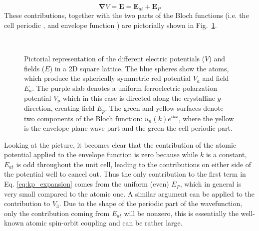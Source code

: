 \begin{equation}
	\bm{\nabla} V = \bm{E} = \bm{E}_{at} + \bm{E}_{P}
\end{equation}
These contributions, together with the two parts of the Bloch functions (i.e. the cell periodic \unkr, and envelope function \eikr) are pictorially shown in Fig.~\ref{fig:Efield_cell_drawing}. 
\begin{figure}[h]
~\centering
{}\caption{\label{fig:Efield_cell_drawing} Pictorial representation of the different electric potentials ($V$) and fields ($E$) in a 2D square lattice. The blue spheres show the atoms, which produce the spherically symmetric red potential $V_a$ and field $E_a$. The purple slab denotes a uniform ferroelectric polarzation potential $V_p$ which in this case is directed along the crystalline $y$-direction, creating field $E_p$. The green and yellow surfaces denote two components of the Bloch function: $u_n(k) e^{ikx}$, where the yellow is the envelope plane wave part and the green the cell periodic part.}
\end{figure}

Looking at the picture, it becomes clear that the contribution of the atomic potential applied to the envelope function is zero because while $k$ is a constant, $E_{at}$ is odd throughout the unit cell, leading to the contributions on either side of the potential well to cancel out. Thus the only contribution to the first term in Eq. \ref{eq:kp_expansion} comes from the uniform (even) $E_P$, which in general is very small compared to the atomic one. A similar argument can be applied to the contribution to $V_3$. Due to the shape of the periodic part of the wavefunction, only the contribution coming from $E_{at}$ will be nonzero, this is essentially the well-known atomic spin-orbit coupling and can be rather large. 


